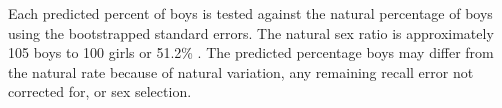 \documentclass[12pt,letterpaper]{article}
\begin{document}
Each predicted percent of boys is tested against the natural percentage of
boys using the bootstrapped standard errors.
The natural sex ratio is approximately 105 boys to 100 girls or
51.2\% \citep{ben-porath76b,jacobsen99,Portner2015b}.
The predicted percentage boys may differ from the natural rate because of 
natural variation, any remaining recall error not corrected for, or 
sex selection. 



















\clearpage
\end{document}
